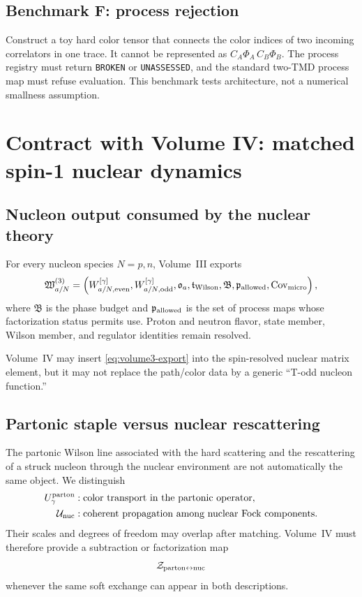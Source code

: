 \documentclass[11pt]{article}
\newcommand{\cZ}{\mathcal Z}
\newcommand{\cU}{\mathcal U}
\newcommand{\odd}{\mathrm{odd}}
\newcommand{\even}{\mathrm{even}}
\begin{document}
\subsection{Benchmark F: process rejection}

Construct a toy hard color tensor that connects the color indices of two
incoming correlators in one trace.  It cannot be represented as
\(C_A\Phi_A\,C_B\Phi_B\).  The process registry must return
\texttt{BROKEN} or \texttt{UNASSESSED}, and the standard two-TMD process map
must refuse evaluation.  This benchmark tests architecture, not a numerical
smallness assumption.

\section{Contract with Volume IV: matched spin-1 nuclear dynamics}
\label{sec:volume4-contract}

\subsection{Nucleon output consumed by the nuclear theory}

For every nucleon species \(N=p,n\), Volume~III exports
\begin{equation}
 \mathfrak W_{a/N}^{(3)}=
 \left(
 W_{a/N,\even}^{[\gamma]},
 W_{a/N,\odd}^{[\gamma]},
 \mathfrak o_a,
 \mathfrak t_{\rm Wilson},
 \mathfrak B,
 \mathfrak p_{\rm allowed},
 \operatorname{Cov}_{\rm micro}
 \right),
\label{eq:volume3-export}
\end{equation}
where \(\mathfrak B\) is the phase budget and
\(\mathfrak p_{\rm allowed}\) is the set of process maps whose factorization
status permits use.  Proton and neutron flavor, state member, Wilson member,
and regulator identities remain resolved.

Volume~IV may insert \cref{eq:volume3-export} into the spin-resolved nuclear
matrix element, but it may not replace the path/color data by a generic
``T-odd nucleon function.''

\subsection{Partonic staple versus nuclear rescattering}

The partonic Wilson line associated with the hard scattering and the
rescattering of a struck nucleon through the nuclear environment are not
automatically the same object.  We distinguish
\begin{align}
 U_{\gamma}^{\rm parton}
 &: \text{color transport in the partonic operator},
\notag\\
 \cU_{\rm nuc}
 &: \text{coherent propagation among nuclear Fock components}.
\label{eq:parton-nuclear-transport}
\end{align}
Their scales and degrees of freedom may overlap after matching.  Volume~IV
must therefore provide a subtraction or factorization map
\begin{equation}
 \cZ_{\rm parton\leftrightarrow nuc}
\label{eq:parton-nuclear-matching}
\end{equation}
whenever the same soft exchange can appear in both descriptions.
\end{document}
